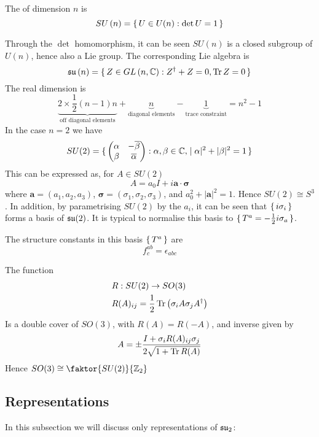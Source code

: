 \documentclass{article}
\begin{document}
\begin{definition}[SU($n$)]
	The  of dimension $n$ is
	\[
	SU\left(n\right)=\set{  U\in U(n) : \det{U}=1  }
	\]
\end{definition}
\noindent Through the $\det$ homomorphism, it can be seen $SU(n)$ is a closed subgroup of $U(n)$, hence also a Lie group.  The corresponding Lie algebra is 
\[
\mathfrak{su}\left(n\right)=\set{  Z\in GL\left(n,\mathbb{C}\right) : Z^\dagger+Z=0, \operatorname{Tr}{Z}=0  }
\]
The real dimension is
\[
\underbrace{2\times\frac{1}{2}(n-1)n}_{\text{off diagonal elements}}+\underbrace{n}_{\text{diagonal elements}}-\underbrace{1}_{\text{trace constraint}}=n^2-1
\]
In the case $n=2$ we have 
\[
SU(2)=\set{    \begin{pmatrix} \alpha & -\overline{\beta} \\ \beta & \overline{\alpha} \end{pmatrix}  : \alpha,\beta\in\mathbb{C} , |\alpha|^2+|\beta|^2=1   }
\]
This can be expressed as, for $A\in SU(2)$
\[
A=a_0 I +i\bm{a}\cdot\bm{\sigma}
\]
where $\bm{a}=(a_1, a_2, a_3)$, $\bm{\sigma}=(\sigma_1, \sigma_2, \sigma_3)$, and $a_0^2+|\bm{a}|^2=1$. Hence $SU(2)\cong S^3$. In addition, by parametrising $SU(2)$ by the $a_i$, it can be seen that $\set{  i\sigma_i }$ forms a basis of $\mathfrak{su}(2)$. It is typical to normalise this basis to $\set{  T^a=-\frac{1}{2} i\sigma_a  }$. 

\begin{fact}
	The structure constants in this basis $\set{  T^a  }$ are 
	\[
	f^{ab}_c=\epsilon_{abc}
	\]
\end{fact}

\begin{fact}
	The function 
	\begin{align*}
		& R : SU(2) \to SO(3) \\
		& R(A)_{ij} = \frac{1}{2}\operatorname{Tr}\left( \sigma_i A \sigma_j A^\dagger \right)
	\end{align*}
	Is a double cover of $SO(3)$, with $R(A)=R(-A)$, and inverse given by 
	\[
	A=\pm \frac{I+\sigma_i R(A)_{ij} \sigma_j}{2\sqrt{1+\operatorname{Tr} R(A)}}
	\]
	Hence $SO(3)\cong\faktor{SU(2)}{\mbb{Z}_2}$
\end{fact}

\subsection{Representations}

In this subsection we will discuss only representations of $\mathfrak{su}_2$:
\end{document}
